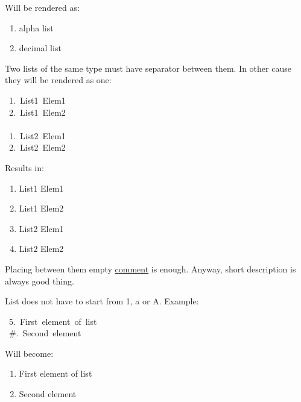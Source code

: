 \documentclass[12pt]{article}
\begin{document}
Will be rendered as:

 \begin{enumerate}[label=\alph*.]
\item
alpha list

\item
decimal list
\end{enumerate}

Two lists of the same type must have separator between them. In other
cause they will be rendered as one:

\begin{ttfamily}\begin{flushleft}
\mbox{~1.~List1~Elem1}\\
\mbox{~2.~List1~Elem2}\\
\mbox{}\\
\mbox{~1.~List2~Elem1}\\
\mbox{~2.~List2~Elem2}\\
\end{flushleft}\end{ttfamily}

Results in:

\begin{enumerate}[label=\arabic*.]
\item
List1 Elem1

\item
List1 Elem2

\item
List2 Elem1

\item
List2 Elem2
\end{enumerate}

Placing between them empty \href{\#lcomment}{comment} is enough. Anyway, short
description is always good thing.

List does not have to start from 1, a or A. Example:

\begin{ttfamily}\begin{flushleft}
\mbox{~5.~First~element~of~list}\\
\mbox{~\#.~Second~element}\\
\end{flushleft}\end{ttfamily}

Will become:

\begin{enumerate}[label=\arabic*.,start=5]
\item
First element of list

\item
Second element
\end{enumerate}
\end{document}
